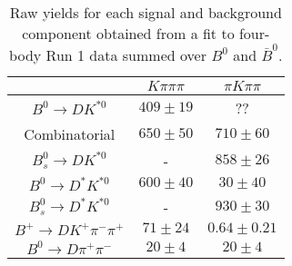 \begin{table}
  \centering
  \begin{tabular}{ccc}
      \toprule
       & $K\pi\pi\pi$ & $\pi K\pi\pi$ \\
      \midrule
      $B^0 \to DK^{*0}$ & $409 \pm 19$ & ?? \\
      Combinatorial & $650 \pm 50$ & $710 \pm 60$ \\
      $B^0_s \to DK^{*0}$ & \-- & $858 \pm 26$ \\
      $B^0 \to D^*K^{*0}$ & $600 \pm 40$ & $30 \pm 40$ \\
      $B^0_s \to D^*K^{*0}$ & \-- & $930 \pm 30$ \\
      $B^+ \to DK^+\pi^-\pi^+$ & $71 \pm 24$ & $0.64 \pm 0.21$ \\
      $B^0 \to D\pi^+\pi^-$ & $20 \pm 4$ & $20 \pm 4$ \\
      \bottomrule
      \end{tabular}
  \caption{Raw yields for each signal and background component obtained from a fit to four-body Run 1 data summed over $B^0$ and $\bar{B}^0$.}
\label{tab:yields_combined_4body_run1}
\end{table}
